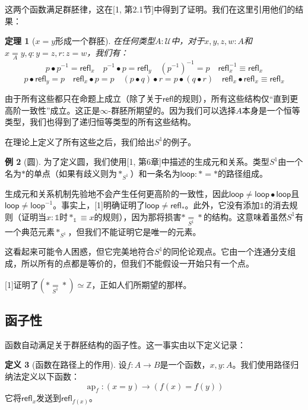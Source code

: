 \documentclass{ctexrep}
\theoremstyle{plain}
\newtheorem{theorem}{定理}[section]
\theoremstyle{definition}
\newtheorem{definition}[theorem]{定义}
\newtheorem{example}[theorem]{例}
\theoremstyle{remark}
\theoremstyle{definition}
\theoremstyle{definition}
\theoremstyle{definition}
\newcommand{\ap}{\operatorname{ap}}
\newcommand{\refl}{\mathsf{refl}}
\newcommand{\UU}{\mathcal{U}}
\begin{document}
这两个函数满足群胚律，这在[1, 第2.1节]中得到了证明。我们在这里引用他们的结果：

\begin{theorem}[$x=y$形成一个群胚]
在任何类型$A:\UU$中，对于$x,y,z,w:A$和$x \underset{A}{=} y,q:y=z,r:z=w$，我们有：
\[
p\bullet p^{-1} = \refl_x \quad p^{-1}\bullet p = \refl_y \quad (p^{-1})^{-1} = p \quad \refl_x^{-1}\equiv\refl_x
\]
\[
p\bullet\refl_y = p \quad \refl_x\bullet p = p \quad (p\bullet q)\bullet r = p\bullet(q\bullet r) \quad \refl_x\bullet\refl_x\equiv\refl_x
\]
\end{theorem}
由于所有这些都只在命题上成立（除了关于$\refl$的规则），所有这些结构仅“直到更高阶一致性”成立。这正是$\infty$-群胚所期望的。因为我们可以选择$A$本身是一个恒等类型，我们也得到了递归恒等类型的所有这些结构。

在理论上定义了所有这些之后，我们给出$S^1$的例子。

\begin{example}[圆]
为了定义圆，我们使用[1, 第6章]中描述的生成元和关系。类型$S^1$由一个名为$\ast$的单点（如果有歧义则为$\ast_{S^1}$）和一条名为$\mathsf{loop}:\ast=\ast$的路径组成。

生成元和关系机制先验地不会产生任何更高阶的一致性，因此$\mathsf{loop}\neq\mathsf{loop}\bullet\mathsf{loop}$且$\mathsf{loop}\neq\mathsf{loop}^{-1}$。事实上，[1]明确证明了$\mathsf{loop}\neq\refl_{\ast}$。此外，它没有添加$\mathbb{1}$的消去规则（证明当$x:\mathbb{1}$时$\ast_{\mathbb{1}}\equiv x$的规则），因为那将损害$\ast\underset{S^1}{=}\ast$的结构。这意味着虽然$S^1$有一个典范元素$\ast_{S^1}$，但我们不能证明它是唯一的元素。

这看起来可能令人困惑，但它完美地符合$S^1$的同伦论观点。它由一个连通分支组成，所以所有的点都是等价的，但我们不能假设一开始只有一个点。

[1]证明了$(\ast\underset{S^1}{=}\ast)\simeq\mathbb{Z}$，正如人们所期望的那样。
\end{example}

\subsection{函子性}

函数自动满足关于群胚结构的函子性。这一事实由以下定义记录：

\begin{definition}[函数在路径上的作用]
设$f:A\to B$是一个函数，$x,y:A$。我们使用路径归纳法定义以下函数：
\[
\ap_f:(x=y)\to(f(x)=f(y))
\]
它将$\refl_x$发送到$\refl_{f(x)}$。
\end{definition}
\end{document}
